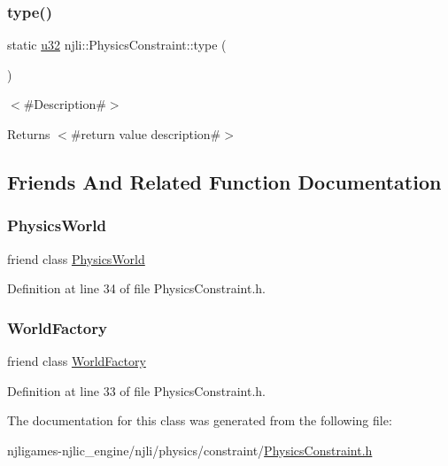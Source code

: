 \subsubsection{\texorpdfstring{type()}{type()}}
{\footnotesize\ttfamily static \mbox{\hyperlink{_util_8h_a10e94b422ef0c20dcdec20d31a1f5049}{u32}} njli\+::\+Physics\+Constraint\+::type (\begin{DoxyParamCaption}{ }\end{DoxyParamCaption})\hspace{0.3cm}{\ttfamily [static]}}

$<$\#\+Description\#$>$

\begin{DoxyReturn}{Returns}
$<$\#return value description\#$>$ 
\end{DoxyReturn}


\subsection{Friends And Related Function Documentation}
\mbox{\label{classnjli_1_1_physics_constraint_abd7959b8cbcd7c25bc6c0c8b1ea26ce6}} 
\subsubsection{\texorpdfstring{Physics\+World}{PhysicsWorld}}
{\footnotesize\ttfamily friend class \mbox{\hyperlink{classnjli_1_1_physics_world}{Physics\+World}}\hspace{0.3cm}{\ttfamily [friend]}}



Definition at line 34 of file Physics\+Constraint.\+h.

\mbox{\label{classnjli_1_1_physics_constraint_acb96ebb09abe8f2a37a915a842babfac}} 
\subsubsection{\texorpdfstring{World\+Factory}{WorldFactory}}
{\footnotesize\ttfamily friend class \mbox{\hyperlink{classnjli_1_1_world_factory}{World\+Factory}}\hspace{0.3cm}{\ttfamily [friend]}}



Definition at line 33 of file Physics\+Constraint.\+h.



The documentation for this class was generated from the following file\+:\begin{DoxyCompactItemize}
\item 
njligames-\/njlic\+\_\+engine/njli/physics/constraint/\mbox{\hyperlink{_physics_constraint_8h}{Physics\+Constraint.\+h}}\end{DoxyCompactItemize}

